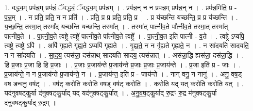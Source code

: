\documentclass[17pt]{extarticle}
\begin{document}
1. वद्ध्य॒म् प्रप॑न्न॒म् प्रप॑न्नं॒ ॅवद्ध्यं॒ ॅवद्ध्य॒म् प्रप॑न्नम् । . प्रप॑न्न॒न् न न प्रप॑न्न॒म् प्रप॑न्न॒न् न । . प्रप॑न्न॒मिति॒ प्र - प॒न्न॒म् । . न प्रति॒ प्रति॒ न न प्रति॑ । . प्रति॒ प्र प्र प्रति॒ प्रति॒ प्र । . प्र य॑च्छन्ति यच्छन्ति॒ प्र प्र य॑च्छन्ति । . य॒च्छ॒न्ति॒ तस्मा॒त् तस्मा᳚द् यच्छन्ति यच्छन्ति॒ तस्मा᳚त् । . तस्मा᳚त् पात्नीव॒ते पा᳚त्नीव॒ते तस्मा॒त् तस्मा᳚त् पात्नीव॒ते । . पा॒त्नी॒व॒ते त्वष्ट्रे॒ त्वष्ट्रे॑ पात्नीव॒ते पा᳚त्नीव॒ते त्वष्ट्रे᳚ । . पा॒त्नी॒व॒त इति॑ पात्नी - व॒ते । . त्वष्ट्रे ऽप्यपि॒ त्वष्ट्रे॒ त्वष्ट्रे ऽपि॑ । . अपि॑ गृह्यते गृह्य॒ते ऽप्यपि॑ गृह्यते । . गृ॒ह्य॒ते॒ न न गृ॑ह्यते गृह्यते॒ न । . न सा॑दयति सादयति॒ न न सा॑दयति । . सा॒द॒य॒ त्यस॑न्ना॒ दस॑न्नाथ् सादयति सादय॒ त्यस॑न्नात् । . अस॑न्ना॒द्धि ह्यस॑न्ना॒ दस॑न्ना॒द्धि । . हि प्र॒जाः प्र॒जा हि हि प्र॒जाः । . प्र॒जाः प्र॒जाय॑न्ते प्र॒जाय॑न्ते प्र॒जाः प्र॒जाः प्र॒जाय॑न्ते । . प्र॒जा इति॑ प्र - जाः । . प्र॒जाय॑न्ते॒ न न प्र॒जाय॑न्ते प्र॒जाय॑न्ते॒ न । . प्र॒जाय॑न्त॒ इति॑ प्र - जाय॑न्ते । . नान् वनु॒ न नानु॑ । . अनु॒ वष॒ड् वष॒ डन्वनु॒ वष॑ट् । . वष॑ट् करोति करोति॒ वष॒ड् वष॑ट् करोति । . क॒रो॒ति॒ यद् यत् क॑रोति करोति॒ यत् । . यद॑नुवषट्कु॒र्या द॑नुवषट्कु॒र्याद् यद् यद॑नुवषट्कु॒र्यात् । . अ॒नु॒व॒ष॒ट्कु॒र्याद् रु॒द्रꣳ रु॒द्र म॑नुवषट्कु॒र्या द॑नुवषट्कु॒र्याद् रु॒द्रम् । \newline
\end{document}
